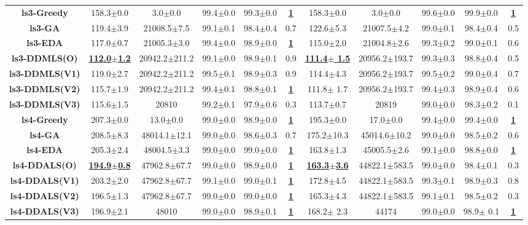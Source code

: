 \documentclass[lettersize,journal]{IEEEtran}
\begin{document}
\begin{table}[!t]
{\begin{tabular}{ccccccccccc}
        \midrule
        {\bfseries ls3-Greedy} &158.3$\pm$0.0 &3.0$\pm$0.0 & 99.4$\pm$0.0 &99.3$\pm$0.0 &\underline{\bfseries 1} &158.3$\pm$0.0 &3.0$\pm$0.0& 99.6$\pm$0.0 &99.9$\pm$0.0 &\underline{\bfseries 1} \\
        {\bfseries ls3-GA} &119.4$\pm$3.9 &21008.5$\pm$7.5 & 99.1$\pm$0.1 &98.4$\pm$0.4 &0.7 &122.6$\pm$5.3 &21007.5$\pm$4.2 &99.0$\pm$0.1& 98.4$\pm$0.4   &0.5 \\
        {\bfseries ls3-EDA} &117.0$\pm$0.7 &21005.3$\pm$3.0 & 99.4$\pm$0.0 &98.9$\pm$0.0 &\underline{\bfseries 1} &115.0$\pm$2.0 &21004.8$\pm$2.6& 99.3$\pm$0.2 &99.0$\pm$0.1 &0.6 \\
        {\bfseries ls3-DDMLS(O)} &\underline{\bfseries112.0$\pm$1.2} &20942.2$\pm$211.2 & 99.1$\pm$0.0 &98.9$\pm$0.1 &0.9 &\underline{\bfseries111.4$\pm$ 1.5} &20956.2$\pm$193.7& 99.3$\pm$0.3 &98.8$\pm$0.4 &0.5 \\
        {\bfseries ls3-DDMLS(V1)} &119.0$\pm$2.7 &20942.2$\pm$211.2 & 99.5$\pm$0.1 &98.9$\pm$0.3 &0.9 &114.4$\pm$4.3 &20956.2$\pm$193.7& 99.5$\pm$0.2 &99.0$\pm$0.4 &0.7 \\
        {\bfseries ls3-DDMLS(V2)} &115.7$\pm$1.9 &20942.2$\pm$211.2 & 99.4$\pm$0.1 &98.8$\pm$0.1 &\underline{\bfseries 1} &111.8$\pm$ 1.7 &20956.2$\pm$193.7& 99.4$\pm$0.3 &98.9$\pm$0.4 &0.6 \\
        {\bfseries ls3-DDMLS(V3)} &115.6$\pm$1.5 &20810 & 99.2$\pm$0.1 &97.9$\pm$0.6 &0.3 &113.7$\pm$0.7 &20819& 99.0$\pm$0.0 &98.3$\pm$0.2 &0.1 \\
        
        \midrule
        {\bfseries ls4-Greedy} &207.3$\pm$0.0&13.0$\pm$0.0 & 99.0$\pm$0.0&98.9$\pm$0.0 &\underline{\bfseries 1} &195.3$\pm$0.0&17.0$\pm$0.0& 99.4$\pm$0.0&99.4$\pm$0.0  &\underline{\bfseries 1} \\
        {\bfseries ls4-GA} &208.5$\pm$8.3&48014.1$\pm$12.1 & 99.0$\pm$0.0&98.6$\pm$0.3&0.7&175.2$\pm$10.3&45014.6$\pm$10.2& 99.0$\pm$0.0&98.5$\pm$0.2  &0.6 \\
        {\bfseries ls4-EDA} &205.3$\pm$2.4&48004.5$\pm$3.3 & 99.0$\pm$0.0&99.0$\pm$0.0 &\underline{\bfseries 1} &163.8$\pm$1.3&45005.5$\pm$2.6& 99.1$\pm$0.0&98.8$\pm$0.0  &\underline{\bfseries 1} \\
        {\bfseries ls4-DDALS(O)} &\underline{\bfseries 194.9$\pm$0.8} &47962.8$\pm$67.7 & 99.0$\pm$0.0&98.9$\pm$0.0 &\underline{\bfseries 1} &\underline{\bfseries 163.3$\pm$3.6} &44822.1$\pm$583.5& 99.0$\pm$0.0&98.4$\pm$0.1  &0.3 \\
        {\bfseries ls4-DDALS(V1)} &203.2$\pm$2.0&47962.8$\pm$67.7 & 99.1$\pm$0.0&99.0$\pm$0.1 &\underline{\bfseries 1} &172.8$\pm$4.5&44822.1$\pm$583.5& 99.3$\pm$0.1&98.9$\pm$0.3  &0.8 \\
        {\bfseries ls4-DDALS(V2)} &196.5$\pm$1.3&47962.8$\pm$67.7 & 99.0$\pm$0.0&99.0$\pm$0.0 &\underline{\bfseries 1} &165.3$\pm$4.3&44822.1$\pm$583.5& 99.1$\pm$0.1&98.5$\pm$0.2  &0.3 \\
        {\bfseries ls4-DDALS(V3)} &196.9$\pm$2.1&48010 & 99.0$\pm$0.0&98.9$\pm$0.1 &\underline{\bfseries 1} &168.2$\pm$ 2.3&44174& 99.0$\pm$0.0& 98.9$\pm$ 0.1  &\underline{\bfseries 1} \\
        

\end{tabular}}
\end{table}
\end{document}
